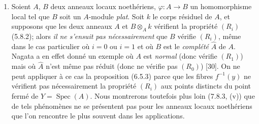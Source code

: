 
\begin{remarks}[6.5.5]
\medskip\noindent
\begin{enumerate}
\item[(i)] Soient $A$, $B$ deux anneaux locaux noethériens,
$\varphi:A\to B$ un homomorphisme local tel que $B$ soit un $A$-module
\emph{plat}. Soit $k$ le corps résiduel de $A$, et supposons que les deux anneaux
$A$ et $B\otimes_Ak$ vérifient la propriété $(R_i)$ (5.8.2); alors \emph{il ne
s'ensuit pas nécessairement} que $B$ vérifie $(R_i)$, même dans le cas
particulier où $i=0$ ou $i=1$ et où $B$ est le \emph{complété} $\widehat A$ de
$A$. Nagata a en effet donné un exemple où $A$ est \emph{normal} (donc vérifie
$(R_1)$) mais où $\widehat A$ n'est même pas réduit (donc ne vérifie pas
$(R_0)$) [30]. On ne peut appliquer à ce cas la proposition (6.5.3)
parce que les fibres $f^{-1}(y)$ ne vérifient pas nécessairement la
propriété $(R_i)$ aux points distincts du point fermé de $Y=\operatorname{Spec}(A)$.
Nous montrerons toutefois plus loin (7.8.3, (v)) que de tels phénomènes
ne se présentent pas pour les anneaux locaux noethériens que l'on rencontre
le plus souvent dans les applications.


\end{enumerate}
\end{remarks}
